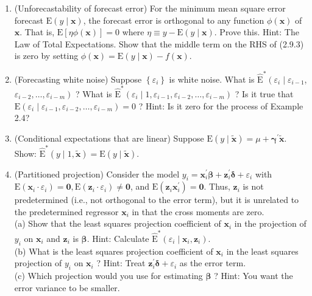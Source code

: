 \documentclass[10pt]{article}
\begin{document}
\begin{enumerate}
  \item (Unforecastability of forecast error) For the minimum mean square error forecast $\mathrm{E}(y \mid \mathbf{x})$, the forecast error is orthogonal to any function $\phi(\mathbf{x})$ of $\mathbf{x}$. That is, $\mathrm{E}[\eta \phi(\mathbf{x})]=0$ where $\eta \equiv y-\mathrm{E}(y \mid \mathbf{x})$. Prove this. Hint: The Law of Total Expectations. Show that the middle term on the RHS of (2.9.3) is zero by setting $\phi(\mathbf{x})=\mathrm{E}(y \mid \mathbf{x})-f(\mathbf{x})$.
  \item (Forecasting white noise) Suppose $\left\{\varepsilon_{i}\right\}$ is white noise. What is $\widehat{\mathrm{E}}^{*}\left(\varepsilon_{i} \mid \varepsilon_{i-1}\right.$, $\left.\varepsilon_{i-2}, \ldots, \varepsilon_{i-m}\right)$ ? What is $\widehat{\mathrm{E}}^{*}\left(\varepsilon_{i} \mid 1, \varepsilon_{i-1}, \varepsilon_{i-2}, \ldots, \varepsilon_{i-m}\right)$ ? Is it true that $\mathrm{E}\left(\varepsilon_{i} \mid\right. \left.\varepsilon_{i-1}, \varepsilon_{i-2}, \ldots, \varepsilon_{i-m}\right)=0$ ? Hint: Is it zero for the process of Example 2.4?
  \item (Conditional expectations that are linear) Suppose $\mathrm{E}(y \mid \tilde{\mathbf{x}})=\mu+\boldsymbol{\gamma}^{\prime} \tilde{\mathbf{x}}$. Show: $\widehat{\mathrm{E}}^{*}(y \mid 1, \tilde{\mathbf{x}})=\mathrm{E}(y \mid \tilde{\mathbf{x}})$.
  \item (Partitioned projection) Consider the model $y_{i}=\mathbf{x}_{i}^{\prime} \boldsymbol{\beta}+\mathbf{z}_{i}^{\prime} \boldsymbol{\delta}+\varepsilon_{i}$ with $\mathrm{E}\left(\mathbf{x}_{i} \cdot\right. \left.\varepsilon_{i}\right)=\mathbf{0}, \mathrm{E}\left(\mathbf{z}_{i} \cdot \varepsilon_{i}\right) \neq \mathbf{0}$, and $\mathrm{E}\left(\mathbf{z}_{i} \mathbf{x}_{i}^{\prime}\right)=\mathbf{0}$. Thus, $\mathbf{z}_{i}$ is not predetermined (i.e., not orthogonal to the error term), but it is unrelated to the predetermined regressor $\mathbf{x}_{i}$ in that the cross moments are zero.\\
(a) Show that the least squares projection coefficient of $\mathbf{x}_{i}$ in the projection of $y_{i}$ on $\mathbf{x}_{i}$ and $\mathbf{z}_{i}$ is $\boldsymbol{\beta}$. Hint: Calculate $\widehat{\mathrm{E}}^{*}\left(\varepsilon_{i} \mid \mathbf{x}_{i}, \mathbf{z}_{i}\right)$.\\
(b) What is the least squares projection coefficient of $\mathbf{x}_{i}$ in the least squares projection of $y_{i}$ on $\mathbf{x}_{i}$ ? Hint: Treat $\mathbf{z}_{i}^{\prime} \boldsymbol{\delta}+\varepsilon_{i}$ as the error term.\\
(c) Which projection would you use for estimating $\boldsymbol{\beta}$ ? Hint: You want the error variance to be smaller.
\end{enumerate}
\end{document}
